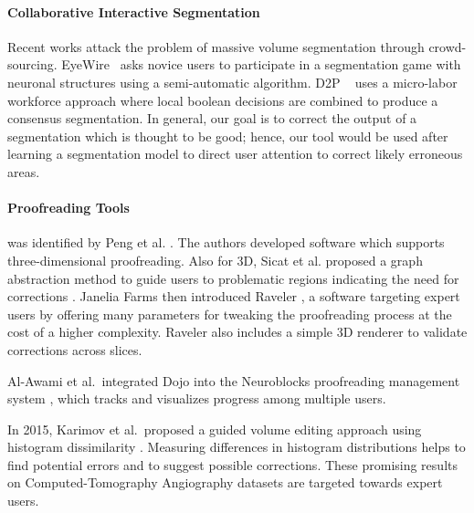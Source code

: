 \paragraph{Collaborative Interactive Segmentation}

Recent works attack the problem of massive volume segmentation through crowd-sourcing\cite{saalfeld09,anderson2011}. EyeWire~\cite{eyewire2012} asks novice users to participate in a segmentation game with neuronal structures using a semi-automatic algorithm. D2P ~\cite{Giuly2013DP2} uses a micro-labor workforce approach where local boolean decisions are combined to produce a consensus segmentation. In general, our goal is to correct the output of a segmentation which is thought to be good; hence, our tool would be used after learning a segmentation model to direct user attention to correct likely erroneous areas.

\paragraph{Proofreading Tools}
 was identified by Peng et al. \cite{proofreading_bottleneck}. The authors developed software which supports three-dimensional proofreading. Also for 3D, Sicat et al. proposed a graph abstraction method to guide users to problematic regions indicating the need for corrections \cite{markus_proofreading}. Janelia Farms then introduced Raveler \cite{raveler}, a software targeting expert users by offering many parameters for tweaking the proofreading process at the cost of a higher complexity. Raveler also includes a simple 3D renderer to validate corrections across slices.

Al-Awami et al.\ integrated Dojo into the Neuroblocks proofreading management system \cite{Neuroblocks}, which tracks and visualizes progress among multiple users.

In 2015, Karimov et al.\ proposed a guided volume editing approach using histogram dissimilarity \cite{karimov_guided_volume_editing}. Measuring differences in histogram distributions helps to find potential errors and to suggest possible corrections. These promising results on Computed-Tomography Angiography datasets are targeted towards expert users.

